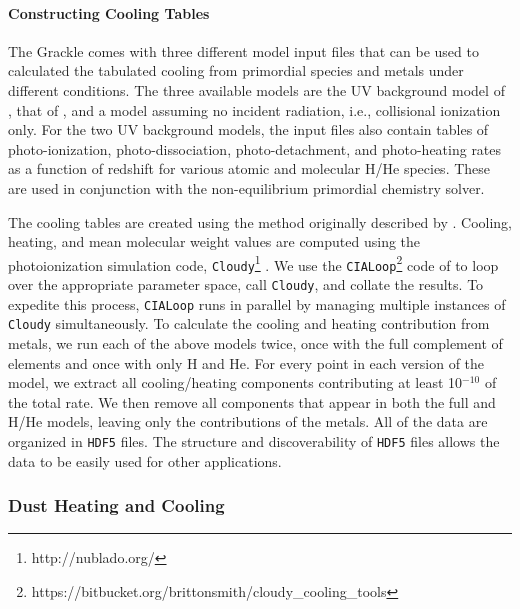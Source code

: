 \paragraph{Constructing Cooling Tables} \label{sec:cooling-tables}

The Grackle comes with three different model input files that can be
used to calculated the tabulated cooling from primordial species and
metals under different conditions.  The three available models are the
UV background model of \citet{2009ApJ...703.1416F}, that of
\citet{2012ApJ...746..125H}, and a model assuming no incident
radiation, i.e., collisional ionization only.  For the two UV
background models, the input files also contain tables of
photo-ionization, photo-dissociation, photo-detachment, and
photo-heating rates as a function of redshift for various atomic and
molecular H/He species.  These are used in conjunction with the
non-equilibrium primordial chemistry solver.

The cooling tables are
created using the method originally described by
\citet{2008MNRAS.385.1443S}.  Cooling, heating, and mean molecular
weight values are computed using the photoionization simulation code, 
\texttt{Cloudy}\footnote{http://nublado.org/}
\citep{2013RMxAA..49..137F}.  We use the
\texttt{CIALoop}\footnote{https://bitbucket.org/brittonsmith/cloudy\_cooling\_tools}
code of \citet{2008MNRAS.385.1443S} to loop over the appropriate
parameter space, call \texttt{Cloudy}, and collate the results.  To
expedite this process, \texttt{CIALoop} runs in parallel by managing
multiple instances of \texttt{Cloudy} simultaneously.  To calculate
the cooling and heating contribution from metals, we run each of the
above models twice, once with the full complement of elements and once
with only H and He.  For every point in each version of the model, we
extract all cooling/heating components contributing at least
10$^{-10}$ of the total rate.  We then remove all components that
appear in both the full and H/He models, leaving only the
contributions of the metals.  All of the data are organized in
\texttt{HDF5} files.  The structure and discoverability of
\texttt{HDF5} files allows the data to be easily used for other
applications.

\subsubsection{Dust Heating and Cooling}

